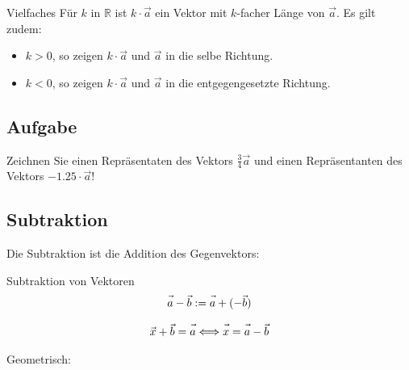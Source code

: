 
\begin{definition}{Vielfaches}{}
  Für $k$ in $\mathbb{R}$ ist $k\cdot{}\vec{a}$ ein Vektor mit
  $k$-facher Länge von $\vec{a}$. Es gilt zudem:

  \begin{itemize}
  \item $k>0$, so zeigen $k\cdot{}\vec{a}$ und $\vec{a}$ in die selbe Richtung.
  \item $k<0$, so zeigen $k\cdot{}\vec{a}$ und $\vec{a}$ in die entgegengesetzte Richtung.
   \end{itemize}
\end{definition}


\subsection*{Aufgabe}
Zeichnen Sie einen Repräsentaten des Vektors $\frac34\vec{a}$ und einen Repräsentanten des Vektors $-1.25 \cdot{} \vec{a}$!


\newpage


\subsection{Subtraktion}

Die Subtraktion ist die Addition des Gegenvektors:

\begin{definition}{Subtraktion von Vektoren}{}
  $$\vec{a\vphantom{b}} - \vec{b} := \vec{a\vphantom{b}} + (-\vec{b})$$
\end{definition}

\begin{bemerkung}{}{}
  $$\vec{x\vphantom{x}} + \vec{b} = \vec{a\vphantom{b}} \Longleftrightarrow \vec{x\vphantom{b}} = \vec{a\vphantom{b}} - \vec{b}$$
\end{bemerkung}

Geometrisch:

